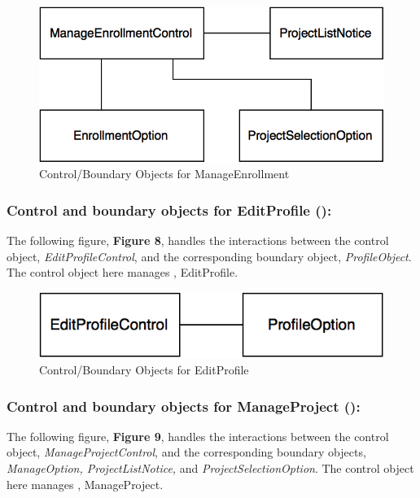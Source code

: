 \documentclass[12pt,letterpaper]{article}
\begin{document}
\vspace{1em}

\begin{figure}[H]
	\centering{}
	\includegraphics[scale=0.37]{imgs/cbod/manage-enrollment.png}
	\caption{Control/Boundary Objects for ManageEnrollment}
\end{figure}

\subsubsection*{Control and boundary objects for EditProfile (\editprofile{}):}

The following figure, {\bf Figure 8}, handles the interactions between the control object, {\it EditProfileControl}, and the corresponding
boundary object, {\it ProfileObject}. The control object here manages \editprofile{}, EditProfile.

\vspace{1em}

\begin{figure}[H]
	\centering{}
	\includegraphics[scale=0.37]{imgs/cbod/edit-profile.png}
	\caption{Control/Boundary Objects for EditProfile}
\end{figure}

\subsubsection*{Control and boundary objects for ManageProject (\manageproject{}):}

The following figure, {\bf Figure 9}, handles the interactions between the control object, {\it ManageProjectControl}, and the corresponding
boundary objects, {\it ManageOption, ProjectListNotice,} and {\it ProjectSelectionOption}. The control object here manages \manageproject{}, ManageProject.
\end{document}
